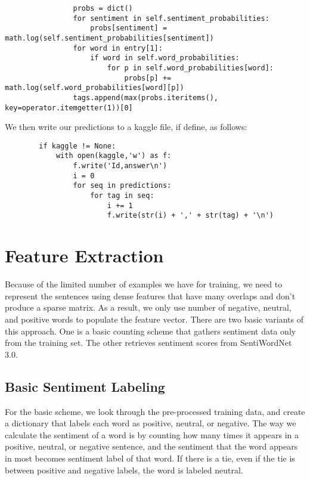 \documentclass{article}
\begin{document}
\begin{verbatim}
                probs = dict()
                for sentiment in self.sentiment_probabilities:
                    probs[sentiment] = math.log(self.sentiment_probabilities[sentiment])
                for word in entry[1]:
                    if word in self.word_probabilities:
                        for p in self.word_probabilities[word]:
                            probs[p] += math.log(self.word_probabilities[word][p])
                tags.append(max(probs.iteritems(), key=operator.itemgetter(1))[0]
\end{verbatim}

We then write our predictions to a kaggle file, if define, as follows:
\begin{verbatim}
        if kaggle != None:
            with open(kaggle,'w') as f:
                f.write('Id,answer\n')
                i = 0
                for seq in predictions:
                    for tag in seq:
                        i += 1
                        f.write(str(i) + ',' + str(tag) + '\n')
\end{verbatim}

\section{Feature Extraction}

Because of the limited number of examples we have for training, we need to represent the sentences using dense features that have many overlaps and don't produce a sparse matrix. As a result, we only use number of negative, neutral, and positive words to populate the feature vector. There are two basic variants of this approach. One is a basic counting scheme that gathers sentiment data only from the training set. The other retrieves sentiment scores from SentiWordNet 3.0.

\subsection{Basic Sentiment Labeling}

For the basic scheme, we look through the pre-processed training data, and create a dictionary that labels each word as positive, neutral, or negative. The way we calculate the sentiment of a word is by counting how many times it appears in a positive, neutral, or negative sentence, and the sentiment that the word appears in most becomes sentiment label of that word. If there is a tie, even if the tie is between positive and negative labels, the word is labeled neutral.
\end{document}
